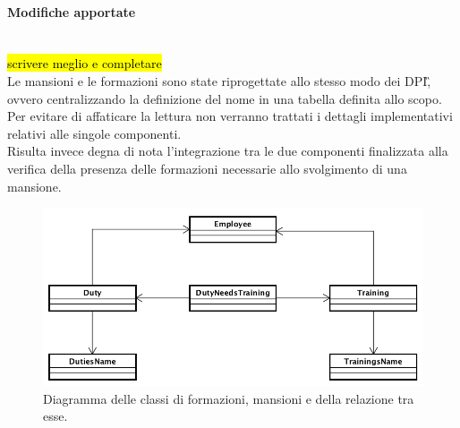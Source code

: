 \paragraph*{Modifiche apportate} \mbox{} \\
\hl{scrivere meglio e completare}\\

Le mansioni e le formazioni sono state riprogettate allo stesso modo dei \gls{DPI}\G, ovvero centralizzando la definizione del nome in una tabella definita allo scopo. \\
Per evitare di affaticare la lettura non verranno trattati i dettagli implementativi relativi alle singole componenti. \\
Risulta invece degna di nota l'integrazione tra le due componenti finalizzata alla verifica della presenza delle formazioni necessarie allo svolgimento di una mansione. \\

\begin{figure}[H]
	\begin{center}
		\includegraphics[width=12cm]{Pics/UMLClassiFormazioniMansioni.png}
		\caption{Diagramma delle classi di formazioni, mansioni e della relazione tra esse.}
		\label{fig:UMLClassiFormazioniMansioni.png}
	\end{center}
\end{figure}

